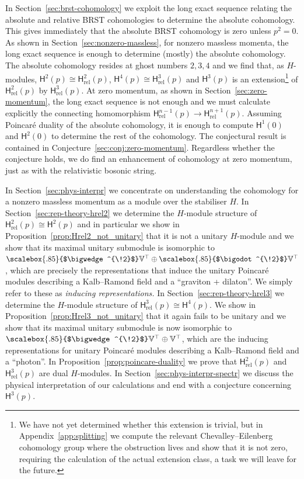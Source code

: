 \documentclass[11pt,reqno,a4paper,final]{amsart}
\newcommand\ext[1]{\scalebox{.85}{$\bigwedge^{\!#1}$}}
\newcommand\sym[1]{\scalebox{.85}{$\bigodot^{\!#1}$}}
\theoremstyle{plain}
\theoremstyle{definition}
\newcommand{\sH}{\mathsf{H}}
\newcommand{\Hrel}{\mathsf{H}_{\mathrm{rel}}}
\newcommand{\VV}{\mathbb{V}}
\newcommand{\1}{\mathbb{1}}
\numberwithin{equation}{section}
\begin{document}
In Section~\ref{sec:brst-cohomology} we exploit the long exact
sequence relating the absolute and relative BRST cohomologies to
determine the absolute cohomology.  This gives immediately that the
absolute BRST cohomology is zero unless $p^2 = 0$.  As shown in
Section~\ref{sec:nonzero-massless}, for nonzero massless momenta, the
long exact sequence is enough to determine (mostly) the absolute
cohomology.  The absolute cohomology resides at ghost numbers $2,3,4$
and we find that, as $H$-modules, $\sH^2(p) \cong \Hrel^2(p)$,
$\sH^4(p) \cong \Hrel^3(p)$ and $\sH^3(p)$ is an extension\footnote{We
  have not yet determined whether this extension is trivial, but in
  Appendix~\ref{app:splitting} we compute the relevant
  Chevalley--Eilenberg cohomology group where the obstruction lives
  and show that it is not zero, requiring the calculation of the
  actual extension class, a task we will leave for the future.} of
$\Hrel^2(p)$ by $\Hrel^3(p)$.  At zero momentum, as shown in
Section~\ref{sec:zero-momentum}, the long exact sequence is not enough
and we must calculate explicitly the connecting homomorphism
$\Hrel^{n-1}(p) \to \Hrel^{n+1}(p)$.  Assuming Poincaré duality of the
absolute cohomology, it is enough to compute $\sH^1(0)$ and $\sH^2(0)$
to determine the rest of the cohomology.  The conjectural result is
contained in Conjecture~\ref{sec:conj:zero-momentum}.  Regardless
whether the conjecture holds, we do find an enhancement of cohomology
at zero momentum, just as with the relativistic bosonic string.

In Section~\ref{sec:phys-interpr} we concentrate on understanding the
cohomology for a nonzero massless momentum as a module over the
stabiliser $H$.  In Section~\ref{sec:rep-theory-hrel2} we determine
the $H$-module structure of $\Hrel^2(p) \cong \sH^2(p)$ and in
particular we show in Proposition~\ref{prop:Hrel2_not_unitary} that it
is not a unitary $H$-module and we show that its maximal unitary
submodule is isomorphic to $\ext{2}\VV^\top \oplus \sym{2}\VV^\top$,
which are precisely the representations that induce the unitary Poincaré modules describing a Kalb--Ramond field and a ``graviton + dilaton''. We simply refer to these as \emph{inducing representations.}  In Section~\ref{sec:rep-theory-hrel3} we determine the $H$-module
structure of $\Hrel^3(p) \cong \sH^4(p)$.  We show in
Proposition~\ref{prop:Hrel3_not_unitary} that it again fails to be
unitary and we show that its maximal unitary submodule is now
isomorphic to $\ext{2}\VV^\top \oplus \VV^\top$, which are the
inducing representations for unitary Poincaré modules describing a
Kalb--Ramond field and a ``photon''.  In
Proposition~\ref{prop:poincare-duality} we prove that $\Hrel^2(p)$ and
$\Hrel^3(p)$ are dual $H$-modules.  In
Section~\ref{sec:phys-interpr-spectr} we discuss the physical
interpretation of our calculations and end with a conjecture
concerning $\sH^3(p)$.
\end{document}
